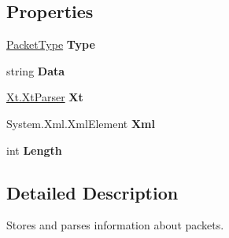 \subsection*{\-Properties}
\begin{DoxyCompactItemize}
\item 
\hypertarget{classSharpenguin_1_1Data_1_1PenguinPacket_ab6770a1a2631dafcd81ec6fd4744ce26}{\hyperlink{classSharpenguin_1_1Data_1_1PenguinPacket_ad526acc6fc64aa52d0a2f13dc9afb111}{\-Packet\-Type} {\bfseries \-Type}}\label{classSharpenguin_1_1Data_1_1PenguinPacket_ab6770a1a2631dafcd81ec6fd4744ce26}

\item 
\hypertarget{classSharpenguin_1_1Data_1_1PenguinPacket_a0303d5d80ae608579fc83fe5a6c2f719}{string {\bfseries \-Data}}\label{classSharpenguin_1_1Data_1_1PenguinPacket_a0303d5d80ae608579fc83fe5a6c2f719}

\item 
\hypertarget{classSharpenguin_1_1Data_1_1PenguinPacket_a93909a2441e03050635ffc5348179093}{\hyperlink{classSharpenguin_1_1Xt_1_1XtParser}{\-Xt.\-Xt\-Parser} {\bfseries \-Xt}}\label{classSharpenguin_1_1Data_1_1PenguinPacket_a93909a2441e03050635ffc5348179093}

\item 
\hypertarget{classSharpenguin_1_1Data_1_1PenguinPacket_a7a8a1be17f28cd0ea097a24ed4e1bfb9}{\-System.\-Xml.\-Xml\-Element {\bfseries \-Xml}}\label{classSharpenguin_1_1Data_1_1PenguinPacket_a7a8a1be17f28cd0ea097a24ed4e1bfb9}

\item 
\hypertarget{classSharpenguin_1_1Data_1_1PenguinPacket_aaaba175295e31224b549598e97dec87a}{int {\bfseries \-Length}}\label{classSharpenguin_1_1Data_1_1PenguinPacket_aaaba175295e31224b549598e97dec87a}

\end{DoxyCompactItemize}


\subsection{\-Detailed \-Description}
\-Stores and parses information about packets. 


